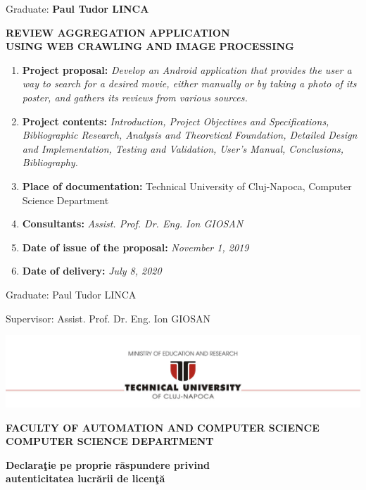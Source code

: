 \documentclass[12pt,a4paper,twoside]{report}
\renewcommand{\thesisauthor}{Paul Tudor LINCA}
\renewcommand{\thesissupervisor}{Assist. Prof. Dr. Eng. Ion GIOSAN}
\newcommand{\department}{\bf FACULTY OF AUTOMATION AND COMPUTER SCIENCE\\
COMPUTER SCIENCE DEPARTMENT}
\newcommand{\utcnlogo}{\includegraphics[width=15cm]{img/tucn.jpg}}
\begin{document}
\begin{center}
Graduate: {\bf \thesisauthor}

\vspace{1cm}

{\bf REVIEW AGGREGATION APPLICATION\\USING WEB CRAWLING AND IMAGE PROCESSING}
\end{center}

\vspace{5mm}

\begin{enumerate}
 \item {\bf Project proposal:} {\it Develop an Android application that provides the user a way to search for a desired movie, either manually or by taking a photo of its poster, and gathers its reviews from various sources. }
\item {\bf Project contents:} {\it  Introduction, Project Objectives and Specifications, Bibliographic Research, Analysis and Theoretical Foundation, Detailed Design and Implementation, Testing and Validation, User’s Manual, Conclusions, Bibliography.}
\item {\bf Place of documentation:} Technical University of Cluj-Napoca, Computer Science Department
\item {\bf Consultants:} {\it \thesissupervisor}
\item {\bf Date of issue of the proposal:} {\it November 1, 2019}
\item {\bf Date of  delivery:} {\it July 8, 2020}
  \end{enumerate}
\vspace{1.2cm}

\hspace{6cm} Graduate: \thesisauthor

\vspace{0.5cm}
\hspace{6cm} Supervisor: \thesissupervisor

\thispagestyle{empty}


\newpage

\begin{center}
\utcnlogo

\department
\end{center}

\vspace{0.5cm}

\begin{center}
{\bf
Declara\c{t}ie pe proprie r\u{a}spundere privind\\ 
autenticitatea lucr\u{a}rii de licen\c{t}\u{a}}
\end{center}
\vspace{1cm}
\end{document}
